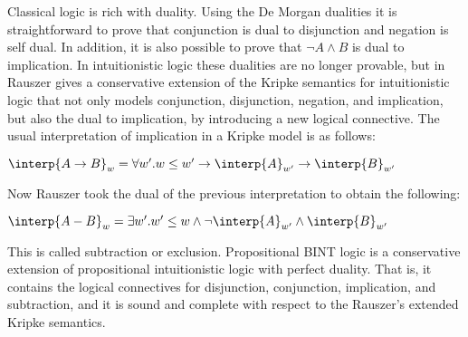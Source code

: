 Classical logic is rich with duality.  Using the De Morgan dualities
it is straightforward to prove that conjunction is dual to disjunction
and negation is self dual.  In addition, it is also possible to prove
that $\lnot A \land B$ is dual to implication.  In intuitionistic
logic these dualities are no longer provable, but in
\cite{Rauszer:1974} Rauszer gives a conservative extension of the
Kripke semantics for intuitionistic logic that not only models
conjunction, disjunction, negation, and implication, but also the dual
to implication, by introducing a new logical connective. The usual
interpretation of implication in a Kripke model is as follows:
\begin{center}
  \begin{math}
    \interp{A \to B}_w = \forall w'.w \leq w' \to \interp{A}_{w'} \to \interp{B}_{w'}
  \end{math}
\end{center}
Now Rauszer took the dual of the previous interpretation to obtain the following:
\begin{center}
  \begin{math}
    \interp{A - B}_w = \exists w'.w' \leq w \land \lnot\interp{A}_{w'} \land \interp{B}_{w'}
  \end{math}
\end{center}
This is called subtraction or exclusion.  Propositional BINT logic is
a conservative extension of propositional intuitionistic logic with
perfect duality.  That is, it contains the logical connectives for
disjunction, conjunction, implication, and subtraction, and it is
sound and complete with respect to the Rauszer's extended Kripke
semantics.

